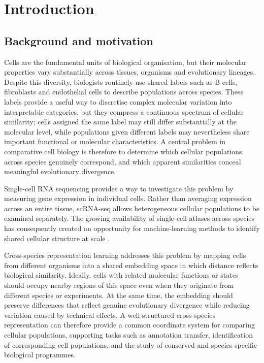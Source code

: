\documentclass{article}
\begin{document}
\section{Introduction}
\subsection{Background and motivation}

Cells are the fundamental units of biological organisation, but their molecular properties vary substantially across tissues, organisms and evolutionary lineages. Despite this diversity, biologists routinely use shared labels such as B cells, fibroblasts and endothelial cells to describe populations across species. These labels provide a useful way to discretise complex molecular variation into interpretable categories, but they compress a continuous spectrum of cellular similarity; cells assigned the same label may still differ substantially at the molecular level, while populations given different labels may nevertheless share important functional or molecular characteristics. A central problem in comparative cell biology is therefore to determine which cellular populations across species genuinely correspond, and which apparent similarities conceal meaningful evolutionary divergence.

Single-cell RNA sequencing provides a way to investigate this problem by measuring gene expression in individual cells. Rather than averaging expression across an entire tissue, scRNA-seq allows heterogeneous cellular populations to be examined separately. The growing availability of single-cell atlases across species has consequently created an opportunity for machine-learning methods to identify shared cellular structure at scale \cite{CellAtlas}.

Cross-species representation learning addresses this problem by mapping cells from different organisms into a shared embedding space in which distance reflects biological similarity. Ideally, cells with related molecular functions or states should occupy nearby regions of this space even when they originate from different species or experiments. At the same time, the embedding should preserve differences that reflect genuine evolutionary divergence while reducing variation caused by technical effects. A well-structured cross-species representation can therefore provide a common coordinate system for comparing cellular populations, supporting tasks such as annotation transfer, identification of corresponding cell populations, and the study of conserved and species-specific biological programmes.
\end{document}
